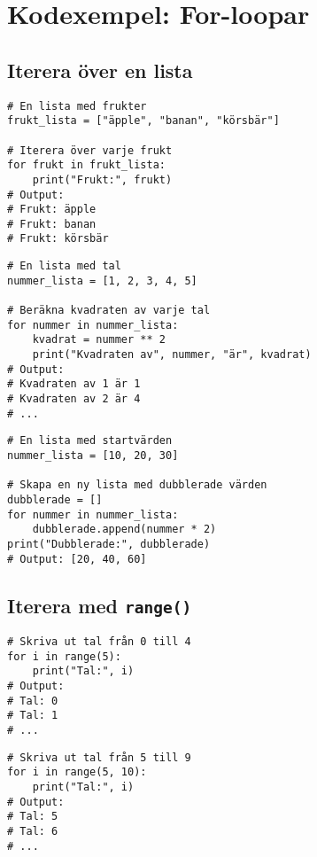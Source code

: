 \section{Kodexempel: For-loopar}
\label{examples:for}
\subsection*{Iterera över en lista}

\begin{lstlisting}[title=Exempel 1: Iterera över en lista med strängar]
# En lista med frukter
frukt_lista = ["äpple", "banan", "körsbär"]

# Iterera över varje frukt
for frukt in frukt_lista:
    print("Frukt:", frukt)
# Output:
# Frukt: äpple
# Frukt: banan
# Frukt: körsbär
\end{lstlisting}

\begin{lstlisting}[title=Exempel 2: Iterera över en lista med tal]
# En lista med tal
nummer_lista = [1, 2, 3, 4, 5]

# Beräkna kvadraten av varje tal
for nummer in nummer_lista:
    kvadrat = nummer ** 2
    print("Kvadraten av", nummer, "är", kvadrat)
# Output:
# Kvadraten av 1 är 1
# Kvadraten av 2 är 4
# ...
\end{lstlisting}

\begin{lstlisting}[title=Exempel 3: Ändra element i en lista (indirekt)]
# En lista med startvärden
nummer_lista = [10, 20, 30]

# Skapa en ny lista med dubblerade värden
dubblerade = []
for nummer in nummer_lista:
    dubblerade.append(nummer * 2)
print("Dubblerade:", dubblerade)
# Output: [20, 40, 60]
\end{lstlisting}

\subsection*{Iterera med \texttt{range()}}

\begin{lstlisting}[title=Exempel 4: Iterera med range()]
# Skriva ut tal från 0 till 4
for i in range(5):
    print("Tal:", i)
# Output:
# Tal: 0
# Tal: 1
# ...
\end{lstlisting}

\begin{lstlisting}[title=Exempel 5: Iterera med start och stopp i range()]
# Skriva ut tal från 5 till 9
for i in range(5, 10):
    print("Tal:", i)
# Output:
# Tal: 5
# Tal: 6
# ...
\end{lstlisting}

